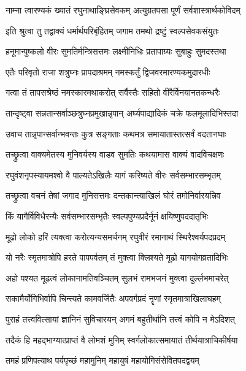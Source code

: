 \twolineshloka
{नाम्ना त्वारण्यकं ख्यातं रघुनाथाङ्घ्रिसेवकम्}
{अत्युग्रतपसा पूर्णं सर्वशास्त्रार्थकोविदम्}%

\twolineshloka
{इति श्रुत्वा तु तद्वाक्यं धर्मार्थपरिबृंहितम्}
{जगाम तमथो द्रष्टुं स्वल्पसेवकसंयुतः}%

\twolineshloka
{हनूमान्पुष्कलो वीरः सुमतिर्मन्त्रिसत्तमः}
{लक्ष्मीनिधिः प्रतापाग्र्यः सुबाहुः सुमदस्तथा}%

\twolineshloka
{एतैः परिवृतो राजा शत्रुघ्नः प्रापदाश्रमम्}
{नमस्कर्तुं द्विजवरमारण्यकमुदारधीः}%

\twolineshloka
{गत्वा तं तापसश्रेष्ठं नमस्कारमथाकरोत्}
{सर्वैस्तैः सहितो वीरैर्विनयानतकन्धरैः}%

\twolineshloka
{तान्दृष्ट्वा सन्नतान्सर्वाञ्छत्रुघ्नप्रमुखान्नृपान्}
{अर्घ्यपाद्यादिकं चक्रे फलमूलादिभिस्तदा}%

\twolineshloka
{उवाच तान्नृपान्सर्वान्भवन्तः कुत्र सङ्गताः}
{कथमत्र समायातास्तत्सर्वं वदतानघाः}%

\twolineshloka
{तच्छ्रुत्वा वाक्यमेतस्य मुनिवर्यस्य वाडव}
{सुमतिः कथयामास वाक्यं वादविचक्षणः}%


\twolineshloka
{रघुवंशनृपस्यायमश्वो वै पाल्यतेऽखिलैः}
{यागं करिष्यते वीरः सर्वसम्भारसम्भृतम्}%

\twolineshloka
{तच्छ्रुत्वा वचनं तेषां जगाद मुनिसत्तमः}
{दन्तकान्त्याखिलं घोरं तमोनिर्वारयन्निव}%


\twolineshloka
{किं यागैर्विविधैरन्यैः सर्वसम्भारसम्भृतैः}
{स्वल्पपुण्यप्रदैर्नूनं क्षयिष्णुपददातृभिः}%

\twolineshloka
{मूढो लोको हरिं त्यक्त्वा करोत्यन्यसमर्चनम्}
{रघुवीरं रमानाथं स्थिरैश्वर्यपदप्रदम्}%

\twolineshloka
{यो नरैः स्मृतमात्रोपि हरते पापपर्वतम्}
{तं मुक्त्वा क्लिश्यते मूढो यागयोगव्रतादिभिः}%

\twolineshloka
{अहो पश्यत मूढत्वं लोकानामतिवञ्चितम्}
{सुलभं रामभजनं मुक्त्वा दुर्ल्लभमाचरेत्}%

\twolineshloka
{सकामैर्योगिभिर्वापि चिन्त्यते कामवर्जितैः}
{अपवर्गप्रदं नॄणां स्मृतमात्राखिलाघहम्}%

\twolineshloka
{पुराहं तत्त्ववित्सायां ज्ञानिनं सुविचारयन्}
{अगमं बहुतीर्थानि तत्त्वं कोपि न मेऽदिशत्}%

\twolineshloka
{तदैकं हि महद्भाग्यात्प्राप्तं वै लोमशं मुनिम्}
{स्वर्गलोकात्समायातं तीर्थयात्राचिकीर्षया}%

\twolineshloka
{तमहं प्रणिपत्याथ पर्यपृच्छं महामुनिम्}
{महायुषं महायोगिसंसेवितपदद्वयम्}%

